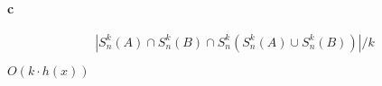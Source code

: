 \paragraph{c}

\begin{equation*}
    |S^{k}_{n}(A) \cap S^{k}_{n}(B) \cap S^{k}_{n}(S^{k}_{n}(A) \cup S^{k}_{n}(B))|/k
\end{equation*}

$O(k \cdot h(x))$
